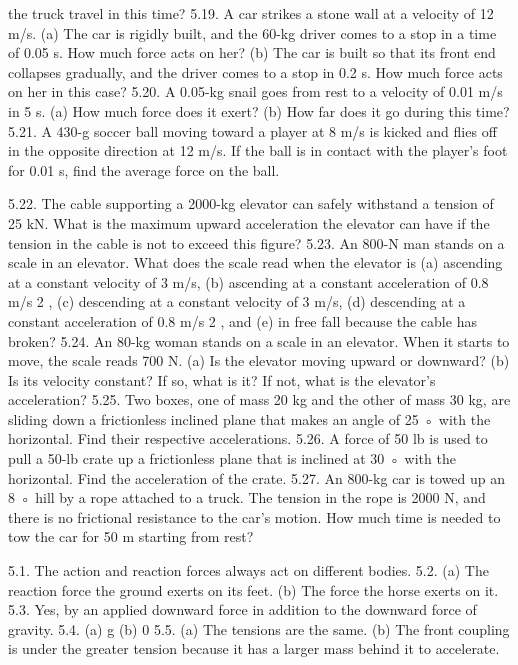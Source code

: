 the truck travel in this time?
5.19. A car strikes a stone wall at a velocity of 12 m/s. (a) The car is rigidly built, and the 60-kg driver comes to a stop in
a time of 0.05 s. How much force acts on her? (b) The car is built so that its front end collapses gradually, and the
driver comes to a stop in 0.2 s. How much force acts on her in this case?
5.20. A 0.05-kg snail goes from rest to a velocity of 0.01 m/s in 5 s. (a) How much force does it exert? (b) How far does it
go during this time?
5.21. A 430-g soccer ball moving toward a player at 8 m/s is kicked and flies off in the opposite direction at 12 m/s. If the
ball is in contact with the player’s foot for 0.01 s, find the average force on the ball.


5.22. The cable supporting a 2000-kg elevator can safely withstand a tension of 25 kN. What is the maximum upward
acceleration the elevator can have if the tension in the cable is not to exceed this figure?
5.23. An 800-N man stands on a scale in an elevator. What does the scale read when the elevator is (a) ascending at a
constant velocity of 3 m/s, (b) ascending at a constant acceleration of 0.8 m/s 2 , (c) descending at a constant velocity
of 3 m/s, (d) descending at a constant acceleration of 0.8 m/s 2 , and (e) in free fall because the cable has broken?
5.24. An 80-kg woman stands on a scale in an elevator. When it starts to move, the scale reads 700 N. (a) Is the elevator
moving upward or downward? (b) Is its velocity constant? If so, what is it? If not, what is the elevator’s acceleration?
5.25. Two boxes, one of mass 20 kg and the other of mass 30 kg, are sliding down a frictionless inclined plane that makes
an angle of 25 ◦ with the horizontal. Find their respective accelerations.
5.26. A force of 50 lb is used to pull a 50-lb crate up a frictionless plane that is inclined at 30 ◦ with the horizontal. Find the
acceleration of the crate.
5.27. An 800-kg car is towed up an 8 ◦ hill by a rope attached to a truck. The tension in the rope is 2000 N, and there is no
frictional resistance to the car’s motion. How much time is needed to tow the car for 50 m starting from rest?




5.1. The action and reaction forces always act on different bodies.
5.2. (a) The reaction force the ground exerts on its feet.
     (b) The force the horse exerts on it.
5.3. Yes, by an applied downward force in addition to the downward force of gravity.
5.4. (a) g (b) 0
5.5. (a) The tensions are the same.
     (b) The front coupling is under the greater tension because it has a larger mass behind it to accelerate.


